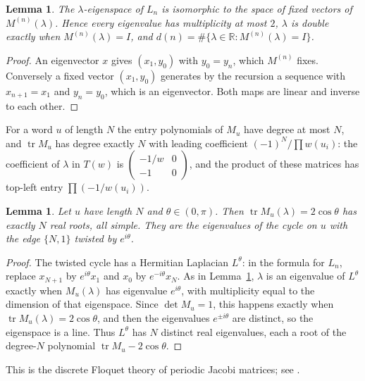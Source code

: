 \documentclass[11pt]{amsart}
\newtheorem{lemma}[theorem]{Lemma}
\theoremstyle{definition}
\newcommand{\tr}{\operatorname{tr}}
\begin{document}
\begin{lemma}\label{lem:fixed}
The $\lambda$-eigenspace of $L_n$ is isomorphic to the space of fixed vectors of $M^{(n)}(\lambda)$. Hence
every eigenvalue has multiplicity at most $2$, $\lambda$ is double exactly when $M^{(n)}(\lambda)=I$, and
$d(n)=\#\{\lambda\in\mathbb{R}:M^{(n)}(\lambda)=I\}$.
\end{lemma}

\begin{proof}
An eigenvector $x$ gives $(x_1,y_0)$ with $y_0=y_n$, which $M^{(n)}$ fixes. Conversely a fixed vector
$(x_1,y_0)$ generates by the recursion a sequence with $x_{n+1}=x_1$ and $y_n=y_0$, which is an eigenvector.
Both maps are linear and inverse to each other.
\end{proof}

For a word $u$ of length $N$ the entry polynomials of $M_u$ have degree at most $N$, and $\tr M_u$ has
degree exactly $N$ with leading coefficient $(-1)^N/\prod w(u_i)$: the coefficient of $\lambda$ in $T(w)$ is
$\left(\begin{smallmatrix}-1/w&0\\-1&0\end{smallmatrix}\right)$, and the product of these matrices has
top-left entry $\prod(-1/w(u_i))$.

\begin{lemma}\label{lem:twist}
Let $u$ have length $N$ and $\theta\in(0,\pi)$. Then $\tr M_u(\lambda)=2\cos\theta$ has exactly $N$ real
roots, all simple. They are the eigenvalues of the cycle on $u$ with the edge $\{N,1\}$ twisted by
$e^{i\theta}$.
\end{lemma}

\begin{proof}
The twisted cycle has a Hermitian Laplacian $L^\theta$: in the formula for $L_n$, replace $x_{N+1}$ by
$e^{i\theta}x_1$ and $x_0$ by $e^{-i\theta}x_N$. As in Lemma~\ref{lem:fixed}, $\lambda$ is an eigenvalue of
$L^\theta$ exactly when $M_u(\lambda)$ has eigenvalue $e^{i\theta}$, with multiplicity equal to the dimension
of that eigenspace. Since $\det M_u=1$, this happens exactly when $\tr M_u(\lambda)=2\cos\theta$, and then the
eigenvalues $e^{\pm i\theta}$ are distinct, so the eigenspace is a line. Thus $L^\theta$ has $N$ distinct real
eigenvalues, each a root of the degree-$N$ polynomial $\tr M_u-2\cos\theta$.
\end{proof}

This is the discrete Floquet theory of periodic Jacobi matrices; see \cite[Section~7.2]{Teschl}.
\end{document}
